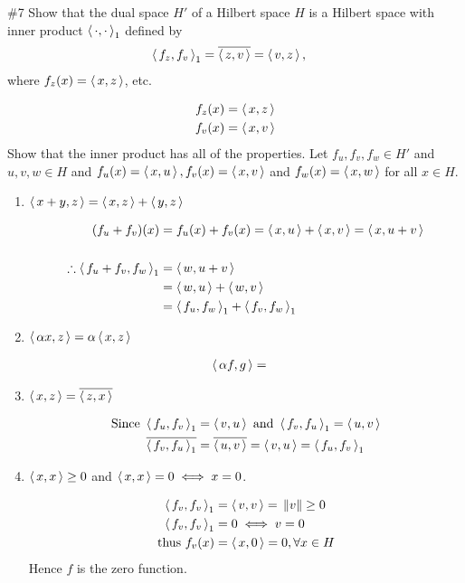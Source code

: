 \documentclass[10pt,a4paper]{report}
\newcommand{\NORM}[1]{\,\left \Vert #1 \right \Vert}
\begin{document}
\noindent \#7 Show that the dual space $H'$ of a Hilbert space $H$ is a Hilbert space with inner product $\left \langle\, \cdot, \cdot \,\right \rangle_1$ defined by
\begin{align*}
	\left \langle\, f_z,f_v \,\right \rangle_1 &= \overline{\left \langle\, z,v \,\right \rangle}= \left \langle\, v,z \,\right \rangle,
\end{align*}where $f_z(x) = \left \langle\, x,z \,\right \rangle$, etc.

\begin{align*}
	f_z(x) &= \left \langle\, x, z \,\right \rangle\\
	f_v(x) &= \left \langle\, x, v \,\right \rangle\\
\end{align*}
\noindent Show that the inner product has all of the properties.  Let $f_u, f_v, f_w \in H'$ and $u, v, w \in H$ and $f_u(x) = \left \langle\, x,u \,\right \rangle, f_v(x) = \left \langle\, x, v \,\right \rangle$ and $f_w(x) = \left \langle\, x,w \,\right \rangle$ for all $x \in H$.
\begin{enumerate}[label=(IP\arabic*)]
	\item $\left \langle\, x+y,z \,\right \rangle = \left \langle\, x,z \,\right \rangle+\left \langle\, y,z \,\right \rangle$

	\begin{align*}
		(f_u+f_v)(x) &= f_u(x)+f_v(x) =  \left \langle\, x,u \,\right \rangle+\left \langle\, x, v \,\right \rangle = \left \langle\, x, u+v \,\right \rangle\\ \\
		\therefore\left \langle\, f_u+f_v,f_w \,\right \rangle_1 &= \left \langle\, w, u+v \,\right \rangle \\
		&= \left \langle\, w,u \,\right \rangle+\left \langle\, w, v \,\right \rangle \\
		&= \left \langle\, f_u,f_w \,\right \rangle_1 + \left \langle\, f_v,f_w \,\right \rangle_1
	\end{align*}
	
	\item $\left \langle\, \alpha x,z \,\right \rangle = \alpha\left \langle\, x,z \,\right \rangle$

	\begin{align*}
		\left \langle\, \alpha f,g \,\right \rangle &=
	\end{align*}		
	
	\item $\left \langle\, x,z \,\right \rangle = \overline{\left \langle\, z,x \,\right \rangle}$
	
	\begin{align*}
		\text{Since } \left \langle\, f_u, f_v \,\right \rangle_1 &= \left \langle\, v,u \,\right \rangle \text{ and } \left \langle\, f_v, f_u \,\right \rangle_1 = \left \langle\, u,v \,\right \rangle\\
		\overline{\left \langle\, f_v, f_u \,\right \rangle_1} &= \overline{\left \langle\, u,v \,\right \rangle} = \left \langle\, v,u \,\right \rangle = \left \langle\, f_u, f_v \,\right \rangle_1
	\end{align*}
	
	\item $\left \langle\, x,x \,\right \rangle \ge 0$ and $\left \langle\, x,x \,\right \rangle=0 \iff x=0$.

	\begin{align*}
		\ABRACKET{f_v, f_v}_1 &= \ABRACKET{v,v} = \NORM{v} \ge 0 \\
		\ABRACKET{f_v, f_v}_1 &= 0 \iff v=0  \\
		\text{thus } f_v(x) &= \ABRACKET{x, 0}=0, \forall x \in H
	\end{align*}	Hence $f$ is the zero function.
	
\end{enumerate}
\end{document}
